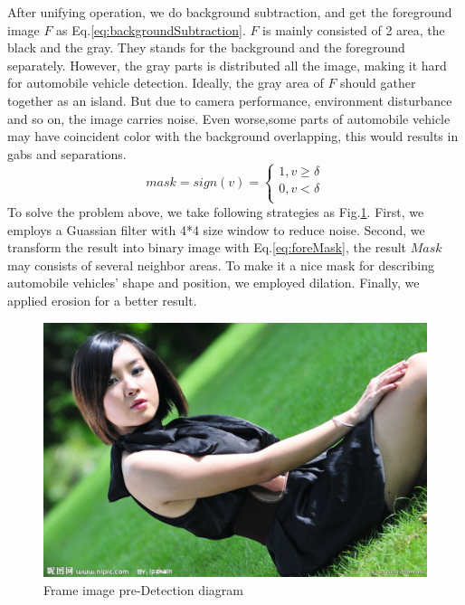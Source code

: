 \documentclass[conference]{IEEEtran}
\begin{document}
	After unifying operation, we do background subtraction, and get the foreground image $F$ as Eq.\ref{eq:backgroundSubtraction}. $F$ is mainly consisted of 2 area, the black and the gray. They stands for the background and the foreground separately. However, the gray parts is distributed all the image, making it hard for automobile vehicle detection. Ideally, the gray area of $F$ should gather together as an island. But due to camera performance, environment disturbance and so on, the image carries noise. Even worse,some parts of automobile vehicle may have coincident color with the background overlapping, this would results in gabs and separations.
	\begin{equation}
	  mask=sign(v)=\left\{
	   \begin{aligned}
	   	1, v \geq \delta \\
	   	0, v < \delta \\
	   \end{aligned}
	   \right.
	   \label{eq:foreMask}
	\end{equation}		
	To solve the problem above, we take following strategies as Fig.\ref{fig:preDetection}. First, we employs a Guassian filter with 4*4 size window to reduce noise. Second, we transform the result into binary image with Eq.\ref{eq:foreMask}, the result $Mask$ may consists of several neighbor areas. To make it a nice mask for describing automobile vehicles' shape and position, we employed dilation. Finally, we applied erosion for a better result. 
	\begin{figure}[!h]
	\centering
	\includegraphics[width=0.8\linewidth]{figures/lena.jpg} 
	\caption{Frame image pre-Detection diagram}
	\label{fig:preDetection}
	\end{figure}
	
\end{document}

